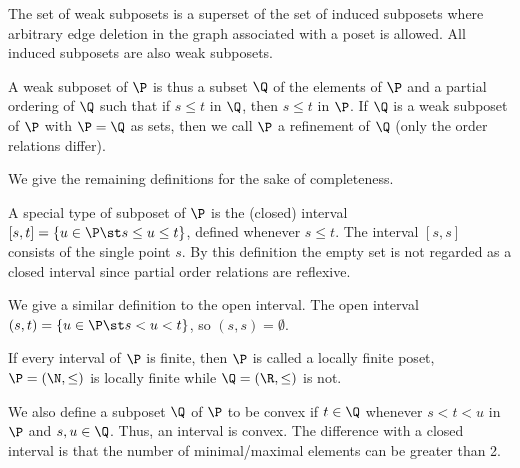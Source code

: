 The set of weak subposets is a superset of the set of induced subposets where
arbitrary edge deletion in the graph associated with a poset is allowed.
All induced subposets are also weak subposets.
\begin{definition}
A weak subposet of $\P$ is thus a subset $\Q$ of the elements of $\P$ and a
partial ordering of $\Q$ such that if $s \leq t$ in $\Q$, then $s \leq t$ in $\P$.
If $\Q$ is a weak subposet of $\P$ with $\P = \Q$ as sets, then we call $\P$ a
refinement of $\Q$ (only the order relations differ).
\end{definition}

We give the remaining definitions for the sake of completeness.
\begin{definition}
A special type of subposet of $\P$ is the (closed) interval $[s, t] = \left\{{u
\in \P \st s \leq u \leq t}\right\}$, defined whenever $s \leq t$. The interval
$[s, s]$ consists of the single point $s$.
By this definition the empty set is not regarded as a closed interval since
partial order relations are reflexive.
\end{definition}
\begin{definition}
We give a similar definition to the open interval.
The open interval $(s, t) = \left\{{u \in \P \st s < u <
t}\right\}$, so $(s, s) = \emptyset$.
\end{definition}
\begin{definition}
If every interval of $\P$ is finite, then $\P$ is called a locally finite poset,
\eg $\P = (\N, \le)$ is locally finite while $\Q = (\R, \le)$ is
not.
\end{definition}
\begin{definition}
We also define a subposet $\Q$ of $\P$ to be convex if $t \in \Q$ whenever $s < t
< u$ in $\P$ and $s, u \in \Q$. Thus, an interval is convex. The difference with a
closed interval is that the number of minimal/maximal elements can be greater than 2.
\end{definition}

